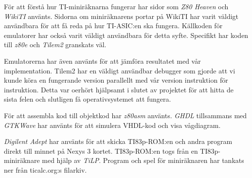 \documentclass[main.tex]{subfiles}
\begin{document}
För att förstå hur TI-miniräknarna fungerar har sidor som {\it Z80 Heaven}
\cite{z80heaven} och {\it WikiTI} \cite{brandonw} använts. Sidorna om
miniräknarens portar på WikiTI har varit väldigt användbara för att få reda på
hur TI-ASIC:en ska fungera. Källkoden för emulatorer har också varit väldigt
användbara för detta syfte. Specifikt har koden till {\it z80e} \cite{z80e} och
{\it Tilem2} \cite{tilem2} granskats väl.

Emulatorerna har även använts för att jämföra resultatet med vår
implementation. Tilem2 har en väldigt användbar debugger som gjorde att vi
kunde köra en fungerande version parallellt med vår version instruktion för
instruktion. Detta var oerhört hjälpsamt i slutet av projektet för att hitta
de sista felen och slutligen få operativsystemet att fungera.

För att assembla kod till objektkod har {\it z80asm}\cite{z80asm} använts.
{\it GHDL}\cite{ghdl} tillsammans med {\it GTKWave}\cite{gtkwave} har använts
för att simulera VHDL-kod och visa vågdiagram.

{\it Digilent Adept} har använts för att skicka TI83p-ROM:en och andra program
direkt till minnet på Nexys 3 kortet. TI83p-ROM:en togs från en
TI83p-miniräknare med hjälp av {\it TiLP}\cite{tilp}. Program och spel för
miniräknaren har tankats ner från ticalc.org:s filarkiv\cite{ticalc}.

\clearpage
\end{document}
